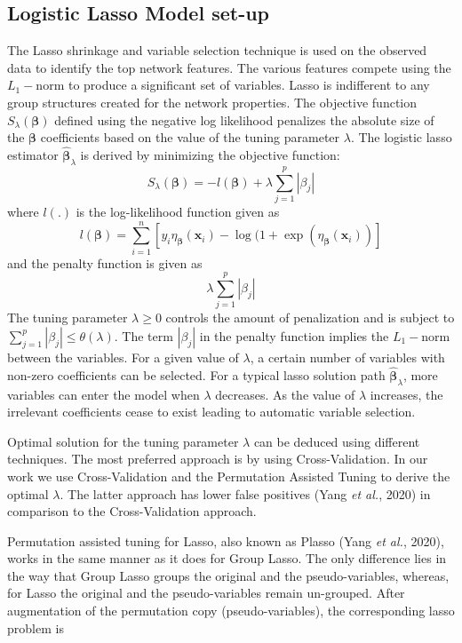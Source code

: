 \subsection{Logistic Lasso Model set-up}\label{subsec:lasso}
The Lasso shrinkage and variable selection technique is used on the observed data to identify the top network features. The various features compete using the $L_1-$norm to produce a significant set of variables. Lasso is indifferent to any group structures created for the network properties. The objective function $S_{\lambda}(\pmb{\beta})$ defined using the negative log likelihood penalizes the absolute size of the $\pmb{\beta}$ coefficients based on the value of the tuning parameter $\lambda$. The logistic lasso estimator $\pmb{\hat\beta}_{\lambda}$ is derived by minimizing the objective function:
\begin{equation}\label{eq:5}
S_{\lambda}(\pmb{\beta}) = -l(\pmb{\beta})+\lambda\sum_{j=1}^{p} |\beta_j|
\end{equation}
where $l(.)$ is the log-likelihood function given as
\begin{equation}\label{eq:6}
l(\pmb{\beta})=\sum_{i=1}^{n}[y_i\eta_{\pmb{\beta}}(\mathbf{x}_i)-\log(1+\exp(\eta_{\pmb{\beta}}(\mathbf{x}_i))]
\end{equation}
and the penalty function is given as
\begin{equation}\label{eq:lasso penalty}
\lambda\sum_{j=1}^{p} |\beta_j|
\end{equation}
The tuning parameter $\lambda\ge 0$ controls the amount of penalization and is subject to $\sum_{j=1}^{p}|\beta_j|\le \theta(\lambda)$. The term $|\beta_j|$ in the penalty function implies the $L_1-$norm between the variables. For a given value of $\lambda$, a certain number of variables with non-zero coefficients can be selected. For a typical lasso solution path $\pmb{\hat\beta}_{\lambda}$, more variables can enter the model when $\lambda$ decreases. As the value of $\lambda$ increases, the irrelevant coefficients cease to exist leading to automatic variable selection.\par 
Optimal solution for the tuning parameter $\lambda$ can be deduced using different techniques. The most preferred approach is by using Cross-Validation. In our work we use Cross-Validation and the Permutation Assisted Tuning to derive the optimal $\lambda$. The latter approach has lower false positives (\cite{permassisttune}Yang \textit{et al.}, 2020) in comparison to the Cross-Validation approach.\par
Permutation assisted tuning for Lasso, also known as Plasso (\cite{permassisttune}Yang \textit{et al.}, 2020), works in the same manner as it does for Group Lasso. The only difference lies in the way that Group Lasso groups the original and the pseudo-variables, whereas, for Lasso the original and the pseudo-variables remain un-grouped. After augmentation of the permutation copy (pseudo-variables), the corresponding lasso problem is
